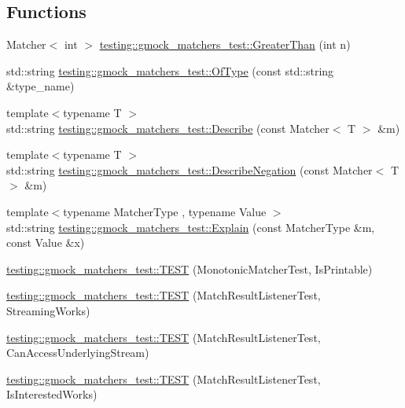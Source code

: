 \subsection*{Functions}
\begin{DoxyCompactItemize}
\item 
Matcher$<$ int $>$ \mbox{\hyperlink{namespacetesting_1_1gmock__matchers__test_a8cf8614a7c9adc8fb00e8af04895f97c}{testing\+::gmock\+\_\+matchers\+\_\+test\+::\+Greater\+Than}} (int n)
\item 
std\+::string \mbox{\hyperlink{namespacetesting_1_1gmock__matchers__test_aea4c2446402f87073f8fec944fc1113c}{testing\+::gmock\+\_\+matchers\+\_\+test\+::\+Of\+Type}} (const std\+::string \&type\+\_\+name)
\item 
{\footnotesize template$<$typename T $>$ }\\std\+::string \mbox{\hyperlink{namespacetesting_1_1gmock__matchers__test_a738a538e1705ea49670aeb3ed25108e6}{testing\+::gmock\+\_\+matchers\+\_\+test\+::\+Describe}} (const Matcher$<$ T $>$ \&m)
\item 
{\footnotesize template$<$typename T $>$ }\\std\+::string \mbox{\hyperlink{namespacetesting_1_1gmock__matchers__test_a96c18b92dede79060a7303fe5d178faf}{testing\+::gmock\+\_\+matchers\+\_\+test\+::\+Describe\+Negation}} (const Matcher$<$ T $>$ \&m)
\item 
{\footnotesize template$<$typename Matcher\+Type , typename Value $>$ }\\std\+::string \mbox{\hyperlink{namespacetesting_1_1gmock__matchers__test_a54e38d7df891801181af4c2acc38c3d5}{testing\+::gmock\+\_\+matchers\+\_\+test\+::\+Explain}} (const Matcher\+Type \&m, const Value \&x)
\item 
\mbox{\hyperlink{namespacetesting_1_1gmock__matchers__test_a4bfc098c6e9ca2766a3dc8f149f62492}{testing\+::gmock\+\_\+matchers\+\_\+test\+::\+T\+E\+ST}} (Monotonic\+Matcher\+Test, Is\+Printable)
\item 
\mbox{\hyperlink{namespacetesting_1_1gmock__matchers__test_a7bc21ec910c3861034d1336fecfcc260}{testing\+::gmock\+\_\+matchers\+\_\+test\+::\+T\+E\+ST}} (Match\+Result\+Listener\+Test, Streaming\+Works)
\item 
\mbox{\hyperlink{namespacetesting_1_1gmock__matchers__test_abc02b215e80c57464c83abdf297b9db7}{testing\+::gmock\+\_\+matchers\+\_\+test\+::\+T\+E\+ST}} (Match\+Result\+Listener\+Test, Can\+Access\+Underlying\+Stream)
\item 
\mbox{\hyperlink{namespacetesting_1_1gmock__matchers__test_ac7ee3826ca24c20fa2a8b388c72eedb2}{testing\+::gmock\+\_\+matchers\+\_\+test\+::\+T\+E\+ST}} (Match\+Result\+Listener\+Test, Is\+Interested\+Works)

\end{DoxyCompactItemize}
